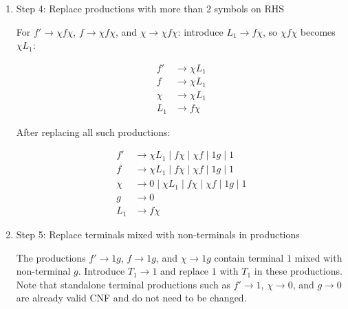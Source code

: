 \documentclass[12pt,a4paper,openany]{article}
\begin{document}
\begin{enumerate}
\begin{enumerate}
        \item For $\chi \to f$: Replace with all non-unit productions of $f$:
        \[
        \chi \to \chi f\chi \mid f\chi \mid \chi f \mid 1g \mid 1
        \]
    \end{enumerate}
    
    After removing all unit productions:

    \[
    \begin{aligned}
        f' &\to \chi f\chi \mid f\chi \mid \chi f \mid 1g \mid 1 \\
        f  &\to \chi f\chi \mid f\chi \mid \chi f \mid 1g \mid 1 \\
        \chi  &\to 0 \mid \chi f\chi \mid f\chi \mid \chi f \mid 1g \mid 1 \\
        g  &\to 0
    \end{aligned}
    \]

    \item Step 4: Replace productions with more than 2 symbols on RHS
    
    For $f' \to \chi f\chi$, $f \to \chi f\chi$, and $\chi \to \chi f\chi$: introduce $L_1 \to f\chi$, so $\chi f\chi$ becomes $\chi L_1$:
    
    \[
    \begin{aligned}
        f' &\to \chi L_1 \\
        f  &\to \chi L_1 \\
        \chi  &\to \chi L_1 \\
        L_1   &\to f\chi
    \end{aligned}
    \]
    
    After replacing all such productions:
    
    \[
    \begin{aligned}
        f' &\to \chi L_1 \mid f\chi \mid \chi f \mid 1g \mid 1 \\
        f  &\to \chi L_1 \mid f\chi \mid \chi f \mid 1g \mid 1 \\
        \chi  &\to 0 \mid \chi L_1 \mid f\chi \mid \chi f \mid 1g \mid 1 \\
        g  &\to 0 \\
        L_1   &\to f\chi
    \end{aligned}
    \]

    \item Step 5: Replace terminals mixed with non-terminals in productions
    
    The productions $f' \to 1g$, $f \to 1g$, and $\chi \to 1g$ contain terminal $1$ mixed 
    with non-terminal $g$. Introduce $T_1 \to 1$ and replace $1$ with $T_1$ in these productions.
    Note that standalone terminal productions such as $f' \to 1$, $\chi \to 0$, and $g \to 0$ 
    are already valid CNF and do not need to be changed.
    

\end{enumerate}
\end{document}
